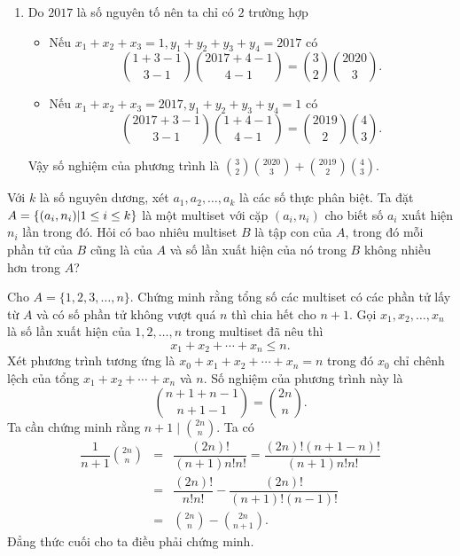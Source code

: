 \begin{bt}
{\begin{enumerate}
 			Vậy số nghiệm của bất phương trình đã cho là $\displaystyle {206 \choose 6} - {105 \choose 6}$.
 			\item Do $ 2017 $ là số nguyên tố nên ta chỉ có $ 2 $ trường hợp
 			\begin{itemize}
 				\item Nếu $ x_1+x_2+x_3=1 , y_1+y_2+y_3+y_4=2017$ có
 				\[ {1+3-1 \choose 3-1} {2017 +4-1 \choose 4-1}={3\choose 2}{2020 \choose 3} .\]
 				\item Nếu $ x_1+x_2+x_3=2017 , y_1+y_2+y_3+y_4=1$ có
 				\[{2017+3-1 \choose 3-1}{1+4-1\choose 4-1}={2019 \choose 2}{4 \choose 3}. \]
 			\end{itemize}
 			Vậy số nghiệm của phương trình là $\displaystyle {3\choose 2} {2020 \choose 3} +{2019 \choose 2} {4 \choose 3} .$
 		\end{enumerate}
 	}
 \end{bt}

 \begin{bt}%
 Với $ k $ là số nguyên dương, xét $ a_1,a_2,\ldots,a_k $ là các số thực phân biệt. Ta đặt $\break A= \{ (a_i,n_i) | 1 \le i \le k \} $ là một multiset với cặp $ (a_i,n_i) $ cho biết số $ a_i $ xuất hiện $ n_i $ lần trong đó. Hỏi có bao nhiêu multiset $ B $ là tập con của $ A $, trong đó mỗi phần tử của $ B $ cũng là của $ A $ và số lần xuất hiện của nó trong $ B $ không nhiều hơn trong $ A $?
 \end{bt}

\begin{bt}%
 Cho $ A=\{1,2,3,\ldots,n\} $. Chứng minh rằng tổng số các multiset có các phần tử lấy từ $ A $ và có số phần tử không vượt quá $ n $ thì chia hết cho $ n+1 $.
 \loigiai
 {
 Gọi $ x_1,x_2,\ldots,x_n $ là số lần xuất hiện của $ 1,2,\ldots,n $ trong multiset đã nêu thì
 \[x_1+x_2+\cdots +x_n \le n.\]
 Xét phương trình tương ứng là $ x_0+x_1+x_2+\cdots +x_n =n $ trong đó $ x_0$ chỉ chênh lệch của tổng $ x_1+x_2+\cdots +x_n $ và $ n $. Số nghiệm của phương trình này là
 \[{n+1+n-1 \choose n+1-1} = {2n \choose n}.\]
 Ta cần chứng minh rằng $ n+1 \mid \displaystyle{2n \choose n}  $. Ta có
 \begin{eqnarray*}
  \dfrac{1}{n+1}{2n \choose n} & = & \dfrac{(2n)!}{(n+1)n!n!}=\dfrac{(2n)!(n+1-n)!}{(n+1)n!n!} \\
  & = & \dfrac{(2n)!}{n!n!}-\dfrac{(2n)!}{(n+1)!(n-1)!} \\
  & = & {2n \choose n} - {2n \choose n+1}.
 \end{eqnarray*}
 Đẳng thức cuối cho ta điều phải chứng minh.
 }
\end{bt}
 
